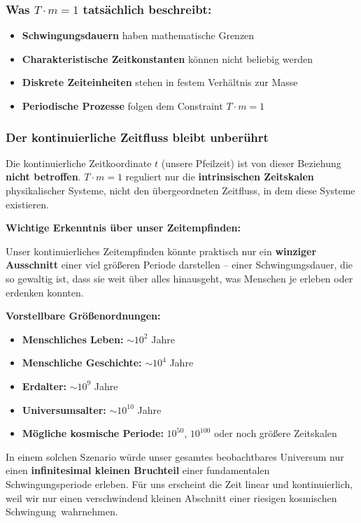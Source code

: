 \documentclass[12pt,a4paper]{article}
\theoremstyle{definition}
\theoremstyle{remark}
\begin{document}
\subsubsection{Was $T \cdot m = 1$ tatsächlich beschreibt:}
\begin{itemize}
	\item \textbf{Schwingungsdauern} haben mathematische Grenzen
	\item \textbf{Charakteristische Zeitkonstanten} können nicht beliebig werden
	\item \textbf{Diskrete Zeiteinheiten} stehen in festem Verhältnis zur Masse
	\item \textbf{Periodische Prozesse} folgen dem Constraint $T \cdot m = 1$
\end{itemize}

\subsubsection{Der kontinuierliche Zeitfluss bleibt unberührt}

Die kontinuierliche Zeitkoordinate $t$ (unsere \glqq Pfeilzeit\grqq) ist von dieser Beziehung \textbf{nicht betroffen}. $T \cdot m = 1$ reguliert nur die \textbf{intrinsischen Zeitskalen} physikalischer Systeme, nicht den übergeordneten Zeitfluss, in dem diese Systeme existieren.

\textbf{Wichtige Erkenntnis über unser Zeitempfinden:}

Unser kontinuierliches Zeitempfinden könnte praktisch nur ein \textbf{winziger Ausschnitt} einer viel größeren Periode darstellen -- einer Schwingungsdauer, die so gewaltig ist, dass sie weit über alles hinausgeht, was Menschen je erleben oder erdenken konnten.

\textbf{Vorstellbare Größenordnungen:}
\begin{itemize}
	\item \textbf{Menschliches Leben:} $\sim 10^2$ Jahre
	\item \textbf{Menschliche Geschichte:} $\sim 10^4$ Jahre
	\item \textbf{Erdalter:} $\sim 10^9$ Jahre
	\item \textbf{Universumsalter:} $\sim 10^{10}$ Jahre
	\item \textbf{Mögliche kosmische Periode:} $10^{50}$, $10^{100}$ oder noch größere Zeitskalen
\end{itemize}

In einem solchen Szenario würde unser gesamtes beobachtbares Universum nur einen \textbf{infinitesimal kleinen Bruchteil} einer fundamentalen Schwingungsperiode erleben. Für uns erscheint die Zeit linear und kontinuierlich, weil wir nur einen verschwindend kleinen Abschnitt einer riesigen kosmischen \glqq Schwingung\grqq\ wahrnehmen.
\end{document}
